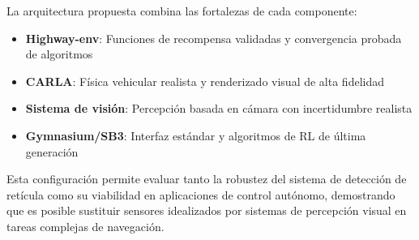 La arquitectura propuesta combina las fortalezas de cada componente:
\begin{itemize}
    \item \textbf{Highway-env}: Funciones de recompensa validadas y convergencia probada de algoritmos
    \item \textbf{CARLA}: Física vehicular realista y renderizado visual de alta fidelidad
    \item \textbf{Sistema de visión}: Percepción basada en cámara con incertidumbre realista
    \item \textbf{Gymnasium/SB3}: Interfaz estándar y algoritmos de RL de última generación
\end{itemize}


Esta configuración permite evaluar tanto la robustez del sistema de detección de retícula
como su viabilidad en aplicaciones de control autónomo, demostrando que es posible sustituir
sensores idealizados por sistemas de percepción visual en tareas complejas de navegación.
